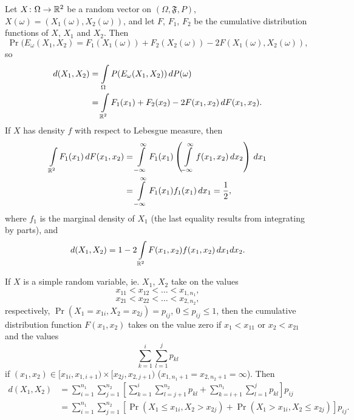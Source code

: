 \begin{rem}
  Let $X \colon \Omega \to \mathbb{R}^2$ be a random vector on $(\Omega,
  \mathfrak{F}, P)$, $X(\omega) = (X_1(\omega), X_2(\omega))$, and let
  $F$, $F_1$, $F_2$ be the cumulative distribution functions of $X$,
  $X_1$ and $X_2$. Then \[ \Pr(E_\omega(X_1, X_2) = F_1(X_1(\omega)) +
  F_2(X_2(\omega)) - 2F(X_1(\omega), X_2(\omega)), \]
  so \[ \begin{split} d(X_1, X_2) &= \int \limits_\Omega
    \mathit{P}(E_\omega(X_1, X_2)) \, d\mathit{P}(\omega) \\ &= \int
    \limits_{\mathbb{R}^2} F_1(x_1) + F_2(x_2) - 2F(x_1, x_2) \, dF(x_1,
    x_2). \end{split} \] If $X$ has density $f$ with respect to
  Lebesgue measure, then \[ \begin{split} \int \limits_{\mathbb{R}^2}
    F_1(x_1) \, dF(x_1, x_2) &= \int \limits_{-\infty}^\infty F_1(x_1)
    \left( \int \limits_{-\infty}^\infty f(x_1, x_2) \, dx_2 \right)
    \, dx_1 \\ &= \int \limits_{-\infty}^\infty F_1(x_1)f_1(x_1) \,
    dx_1 = \frac{1}{2}, \end{split} \] where $f_1$ is the marginal
  density of $X_1$ (the last equality results from integrating by
  parts), and
  \begin{equation} \label{eq:defofd}
    d(X_1, X_2) = 1 - 2 \int \limits_{\mathbb{R}^2} F(x_1, x_2) f(x_1,
    x_2) \, dx_1dx_2.
  \end{equation}

  If $X$ is a simple random variable, ie. $X_1$, $X_2$ take on the
  values
  \begin{equation*}
    x_{11} < x_{12} < \ldots < x_{1,n_1},
  \end{equation*}
  \begin{equation*}
    x_{21} < x_{22} < \ldots < x_{2,n_2},
  \end{equation*}
  respectively, $\Pr(X_1 = x_{1i}, X_2 = x_{2j}) = p_{ij}$, $0 \leq
  p_{ij} \leq 1$, then the cumulative distribution function $F(x_1,
  x_2)$ takes on the value zero if $x_1 < x_{11}$ or $x_2 < x_{21}$
  and the values \[ \sum_{k = 1}^i \sum_{l = 1}^j p_{kl} \] if $(x_1,
  x_2) \in [x_{1i}, x_{1, i + 1}) \times [x_{2j}, x_{2, j + 1})$
      ($x_{1, n_1 + 1} = x_{2, n_2 + 1} = \infty$).
      Then \[ \begin{split}
        d(X_1, X_2) & = \sum_{i = 1}^{n_1} \sum_{j = 1}^{n_2} \left[
          \sum_{k = 1}^{i} \sum_{l = j + 1}^{n_2} p_{kl} +
          \sum_{k = i + 1}^{n_1} \sum_{l = 1}^{j} p_{kl} \right]
          p_{ij} \\
        & = \sum_{i = 1}^{n_1} \sum_{j = 1}^{n_2} \left[ \Pr(X_1 \leq
            x_{1i}, X_2 > x_{2j}) + \Pr(X_1 > x_{1i}, X_2 \leq x_{2j})
            \right] p_{ij}.
      \end{split} \]
\end{rem}

